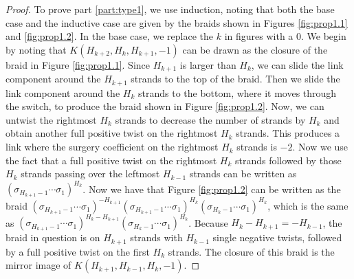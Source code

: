 \documentclass{amsart}
\begin{document}
\begin{proof}
To prove part \ref{part:type1}, we use induction, noting that both the base case and the inductive case are given by the braids shown in Figures \ref{fig:prop1.1} and \ref{fig:prop1.2}. In the base case, we replace the $k$ in figures with a $0$. We begin by noting that $K(H_{k+2}, H_{k}, H_{k+1}, -1)$ can be drawn as the closure of the braid in Figure \ref{fig:prop1.1}. Since $H_{k+1}$ is larger than $H_k$, we can slide the link component around the $H_{k+1}$ strands to the top of the braid. Then we slide the link component around the $H_k$ strands to the bottom, where it moves through the switch, to produce the braid shown in Figure \ref{fig:prop1.2}. Now, we can untwist the rightmost $H_k$ strands to decrease the number of strands by $H_k$ and obtain another full positive twist on the rightmost $H_k$ strands. This produces a link where the surgery coefficient on the rightmost $H_k$ strands is $-2$. Now we use the fact that a full positive twist on the rightmost $H_k$ strands followed by those $H_k$ strands passing over the leftmost $H_{k-1}$ strands can be written as $(\sigma_{H_{k+1}-1} \cdots \sigma_1)^{H_k}$. Now we have that Figure \ref{fig:prop1.2} can be written as the braid $(\sigma_{H_{k+1}-1} \cdots \sigma_1)^{-H_{k+1}}(\sigma_{H_{k+1}-1} \cdots \sigma_1)^{H_k} (\sigma_{H_{k}-1} \cdots \sigma_1)^{H_k}$, which is the same as $(\sigma_{H_{k+1}-1} \cdots \sigma_1)^{H_k-H_{k+1}} (\sigma_{H_{k}-1} \cdots \sigma_1)^{H_k}$. Because $H_k-H_{k+1} = -H_{k-1}$, the braid in question is on $H_{k+1}$ strands with $H_{k-1}$ single negative twists, followed by a full positive twist on the first $H_k$ strands. The closure of this braid is the mirror image of $K(H_{k+1}, H_{k-1}, H_k, -1)$. \end{proof}
\end{document}
